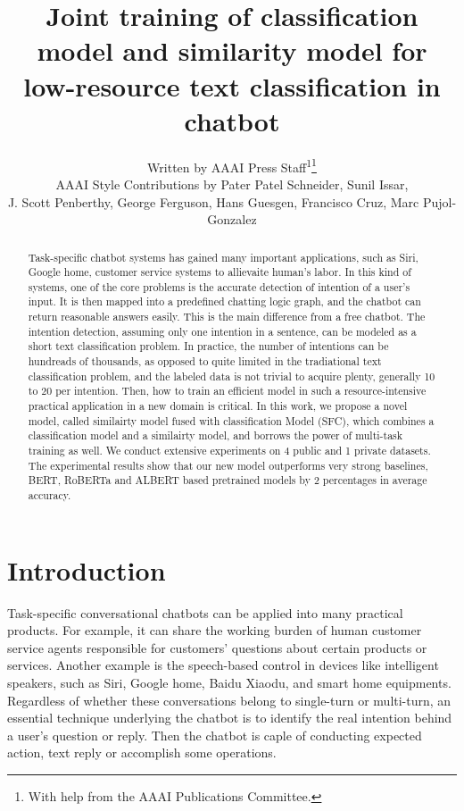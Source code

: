 \documentclass[letterpaper]{article} %
\title{     
  Joint training of classification model and similarity model for low-resource
  text classification in chatbot
}
\author{
  Written by AAAI Press Staff\textsuperscript{\rm 1}\thanks{With help from the AAAI Publications Committee.}\\
  AAAI Style Contributions by Pater Patel Schneider,
  Sunil Issar,  \\
  J. Scott Penberthy,
  George Ferguson,
  Hans Guesgen,
  Francisco Cruz,
  Marc Pujol-Gonzalez
  \\
}
\begin{document}
  \maketitle

  \begin{abstract}
    Task-specific  chatbot  systems has gained many important applications, such
    as  Siri, Google home, customer service systems to allievaite human's labor.
    In  this  kind  of  systems, one of the core problems is the accurate detection of
    intention  of  a  user's input. It is then mapped into a predefined chatting
    logic  graph,  and the chatbot can return reasonable answers easily. This is
    the  main  difference from a free chatbot. The intention detection, assuming
    only  one  intention  in  a  sentence,  can  be  modeled  as  a  short  text
    classification  problem.  In  practice,  the  number  of  intentions  can be
    hundreads of thousands, as opposed to quite limited in the tradiational text
    classification  problem,  and  the  labeled  data  is not trivial to acquire
    plenty,  generally  10  to 20 per intention. Then, how to train an efficient
    model  in such a resource-intensive practical application in a new domain is
    critical.  In  this  work, we propose a novel model, called similairty model
    fused with classification Model (SFC), which combines a classification model
    and  a  similairty  model,  and  borrows the power of multi-task training as
    well.  We  conduct extensive experiments on 4 public and 1 private datasets.
    The  experimental  results  show  that our new model outperforms very strong
    baselines, BERT, RoBERTa and ALBERT based pretrained models by 2 percentages
    in average accuracy.

  \end{abstract}

  \section{Introduction}
  \label{sec:intro}

  Task-specific  conversational  chatbots  \cite{wen2016network}  can be applied
  into  many practical products. For example, it can share the working burden of
  human  customer  service  agents  responsible  for  customers' questions about
  certain  products  or services. Another example is the speech-based control in
  devices  like  intelligent  speakers, such as Siri, Google home, Baidu Xiaodu,
  and smart home equipments. Regardless of whether these conversations belong to
  single-turn or multi-turn, an essential technique underlying the chatbot is to
  identify  the  real  intention  behind  a  user's  question or reply. Then the
  chatbot  is caple of conducting expected action, text reply or accomplish some
  operations.
\end{document}
